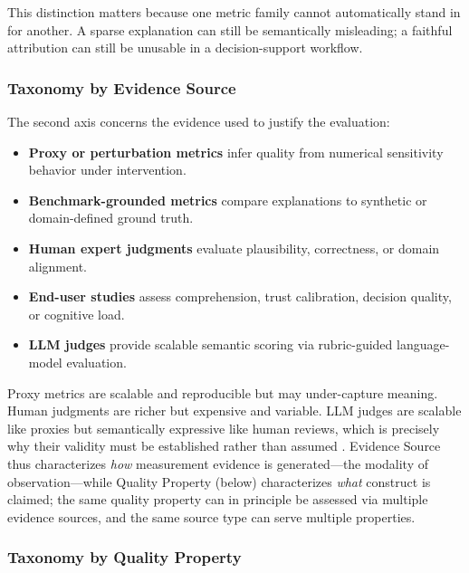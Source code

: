 \documentclass[fleqn,10pt,lineno]{wlpeerj}
\begin{document}
This distinction matters because one metric family cannot automatically
stand in for another. A sparse explanation can still be semantically
misleading; a faithful attribution can still be unusable in a
decision-support workflow.

\subsubsection{Taxonomy by Evidence Source}

The second axis concerns the evidence used to justify the evaluation:
\begin{itemize}[leftmargin=*]
\item \textbf{Proxy or perturbation metrics} infer quality from numerical
sensitivity behavior under intervention.
\item \textbf{Benchmark-grounded metrics} compare explanations to
synthetic or domain-defined ground truth.
\item \textbf{Human expert judgments} evaluate plausibility, correctness,
or domain alignment.
\item \textbf{End-user studies} assess comprehension, trust calibration,
decision quality, or cognitive load.
\item \textbf{LLM judges} provide scalable semantic scoring via
rubric-guided language-model evaluation.
\end{itemize}

Proxy metrics are scalable and reproducible but may under-capture meaning.
Human judgments are richer but expensive and variable. LLM judges are
scalable like proxies but semantically expressive like human reviews,
which is precisely why their validity must be established rather than
assumed \citep{gu2024llmjudge,wu2025userperceptions,zhou2025medthink}.
Evidence Source thus characterizes \emph{how} measurement evidence is generated---the modality of observation---while Quality Property (below) characterizes \emph{what} construct is claimed; the same quality property can in principle be assessed via multiple evidence sources, and the same source type can serve multiple properties.

\subsubsection{Taxonomy by Quality Property}
\end{document}
